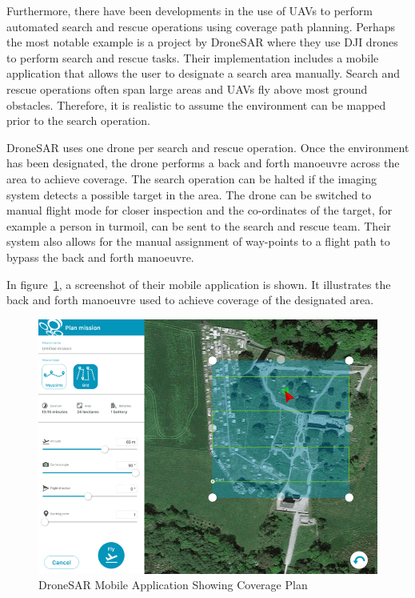 Furthermore, there have been developments in the use of UAVs to perform automated search and rescue operations using coverage path planning. Perhaps the most notable example is a project by DroneSAR where they use DJI drones to perform search and rescue tasks. Their implementation includes a mobile application that allows the user to designate a search area manually\cite{DroneSAR01}. Search and rescue operations often span large areas and UAVs fly above most ground obstacles. Therefore, it is realistic to assume the environment can be mapped prior to the search operation\cite{CPP-Survey-2013}.

DroneSAR uses one drone per search and rescue operation. Once the environment has been designated, the drone performs a back and forth manoeuvre across the area to achieve coverage. The search operation can be halted if the imaging system detects a possible target in the area. The drone can be switched to manual flight mode for closer inspection and the co-ordinates of the target, for example a person in turmoil, can be sent to the search and rescue team. Their system also allows for the manual assignment of way-points to a flight path to bypass the back and forth manoeuvre.\cite{DroneSAR02}

In figure~\ref{fig:DroneSAR}, a screenshot of their mobile application is shown. It illustrates the back and forth manoeuvre used to achieve coverage of the designated area.

\begin{figure}[h]
	\centering
	\includegraphics[scale=0.3]{figs/content_DroneSAR_screenshot_3.png}
	\caption{DroneSAR Mobile Application Showing Coverage Plan\cite{DroneSAR01}}
	\label{fig:DroneSAR}
\end{figure}

